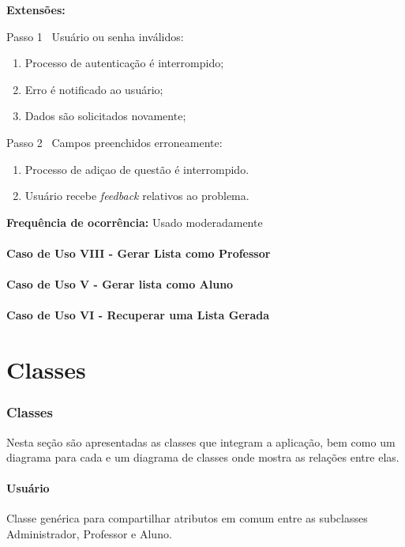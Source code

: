 \documentclass[12pt,oneside,a4paper,article]{abntex2}
\begin{document}
		\textbf{Extensões:} 
		
		Passo 1 \textrightarrow \ Usuário ou senha inválidos:
		
		\begin{enumerate}[label=\alph*.]	
			\item Processo de autenticação é interrompido;
			\item Erro é notificado ao usuário;
			\item Dados são solicitados novamente;
		\end{enumerate}
		
		Passo 2 \textrightarrow \ Campos preenchidos erroneamente:
		
		\begin{enumerate}[label=\alph*.]	
			\item Processo de adiçao de questão é interrompido.
			\item Usuário recebe \textit{feedback} relativos ao problema.	
		\end{enumerate}
		
		\textbf{Frequência de ocorrência:} Usado moderadamente
	
		\subsection{Caso de Uso VIII - Gerar Lista como Professor}
	
		\subsection{Caso de Uso V - Gerar lista como Aluno}
	
		\subsection{Caso de Uso VI - Recuperar uma Lista Gerada}

\part{Classes}
	\section{Classes}
		Nesta seção são apresentadas as classes que integram a aplicação, bem como um diagrama para cada e um diagrama de classes onde mostra
		as relações entre elas.
		
		\subsection{Usuário}
			Classe genérica para compartilhar atributos em comum entre as subclasses Administrador, Professor e Aluno.
	
\end{document}
